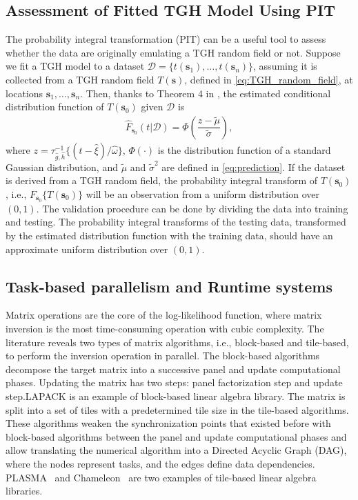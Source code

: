 \documentclass[conference]{IEEEtran}
\begin{document}
\subsection{Assessment of Fitted TGH Model Using PIT}
The probability integral transformation (PIT) can be a 
useful tool to assess whether the data are originally 
emulating a TGH random field or not. Suppose we fit a TGH 
model to a dataset $\mathcal{D} = \{t(\bm s_1),\ldots,t(\bm s_n)\}$, assuming it is collected from a TGH random field $T(\bm s)$, 
defined in \eqref{eq:TGH_random_field}, at locations $\bm s_1,\ldots,\bm s_n$. Then, thanks to Theorem 4 in \cite{xu2017tukey},
the estimated conditional distribution function of $T(\bm s_0)$ given $\mathcal{D}$ is
\begin{equation}
\begin{split}
\widehat{F}_{\bm s_0} (t| \mathcal{D}) = \Phi \left( \dfrac{z - \tilde{\mu}}{\tilde{\sigma}} \right),
\end{split}
\label{eq:CDF}
\end{equation}
where $z = \tau^{-1}_{\widehat{g},\widehat{h}} \{(t - \widehat{\xi})/\widehat{\omega}\}$, $\Phi(\cdot)$ is the distribution function of 
a standard Gaussian distribution, and $\tilde{\mu}$ and $\tilde{\sigma}^2$ are defined in \eqref{eq:prediction}. If the dataset is 
derived from a TGH random field, the probability 
integral transform of $T(\bm s_0)$, i.e., $ {F}_{\bm s_0}\{T(\bm s_0) \}$ will be an observation from a uniform distribution over $(0,1)$. The
validation procedure can be done by dividing the data into training and testing. The probability integral transforms of the testing data, 
transformed by the estimated distribution function 
with the training data, should have an approximate 
uniform distribution over $(0,1)$. 

\subsection{Task-based parallelism and Runtime systems}
Matrix operations are the core of the log-likelihood function, where matrix inversion is the most time-consuming operation with cubic complexity. The literature reveals two types of matrix algorithms, i.e., block-based and tile-based, to perform the inversion operation in parallel.  The block-based algorithms decompose the target matrix into a successive panel and
update computational phases. Updating the matrix has two steps: panel factorization step and update step.LAPACK is an example of block-based 
linear algebra library. The matrix is split into a set of tiles with a predetermined tile size in the tile-based algorithms. These algorithms weaken the synchronization points that existed before with block-based algorithms between the panel and update computational phases and allow translating the numerical algorithm into a Directed Acyclic Graph (DAG), where the
nodes represent tasks, and the edges define data dependencies. PLASMA~\cite{dongarra2019plasma} and Chameleon~\cite{chameleon-soft} are two examples of tile-based linear algebra libraries.
\end{document}
